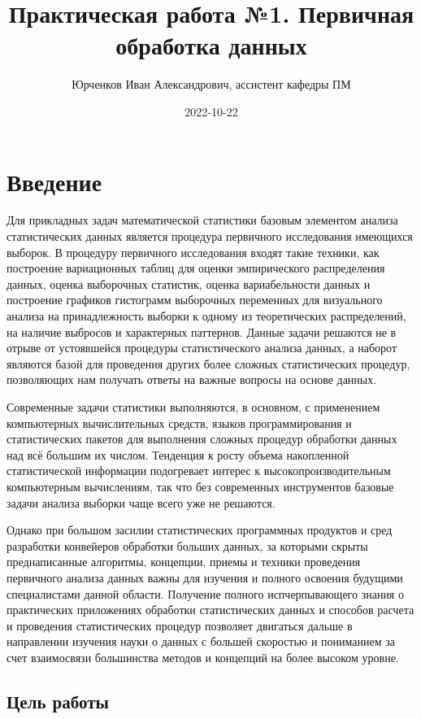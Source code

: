 \documentclass[
]{article}
\title{Практическая работа №1. Первичная обработка данных}
\author{Юрченков Иван Александрович, ассистент кафедры ПМ}
\date{2022-10-22}
\begin{document}
\maketitle

\hypertarget{ux432ux432ux435ux434ux435ux43dux438ux435}{%
\section{\texorpdfstring{\textbf{Введение}}{Введение}}\label{ux432ux432ux435ux434ux435ux43dux438ux435}}

Для прикладных задач математической статистики базовым элементом анализа
статистических данных является процедура первичного исследования
имеющихся выборок. В процедуру первичного исследования входят такие
техники, как построение вариационных таблиц для оценки эмпирического
распределения данных, оценка выборочных статистик, оценка вариабельности
данных и построение графиков гистограмм выборочных переменных для
визуального анализа на принадлежность выборки к одному из теоретических
распределений, на наличие выбросов и характерных паттернов. Данные
задачи решаются не в отрыве от устоявшейся процедуры статистического
анализа данных, а наборот являются базой для проведения других более
сложных статистических процедур, позволяющих нам получать ответы на
важные вопросы на основе данных.

Современные задачи статистики выполняются, в основном, с применением
компьютерных вычислительных средств, языков программирования и
статистических пакетов для выполнения сложных процедур обработки данных
над всё большим их числом. Тенденция к росту объема накопленной
статистической информации подогревает интерес к высокопроизводительным
компьютерным вычислениям, так что без современных инструментов базовые
задачи анализа выборки чаще всего уже не решаются.

Однако при большом засилии статистических программных продуктов и сред
разработки конвейеров обработки больших данных, за которыми скрыты
преднаписанные алгоритмы, концепции, приемы и техники проведения
первичного анализа данных важны для изучения и полного освоения будущими
специалистами данной области. Получение полного испчерпывающего знания о
практических приложениях обработки статистических данных и способов
расчета и проведения статистических процедур позволяет двигаться дальше
в направлении изучения науки о данных с большей скоростью и пониманием
за счет взаимосвязи большинства методов и концепций на более высоком
уровне.

\hypertarget{ux446ux435ux43bux44c-ux440ux430ux431ux43eux442ux44b}{%
\subsection{\texorpdfstring{\textbf{Цель
работы}}{Цель работы}}\label{ux446ux435ux43bux44c-ux440ux430ux431ux43eux442ux44b}}
\end{document}
